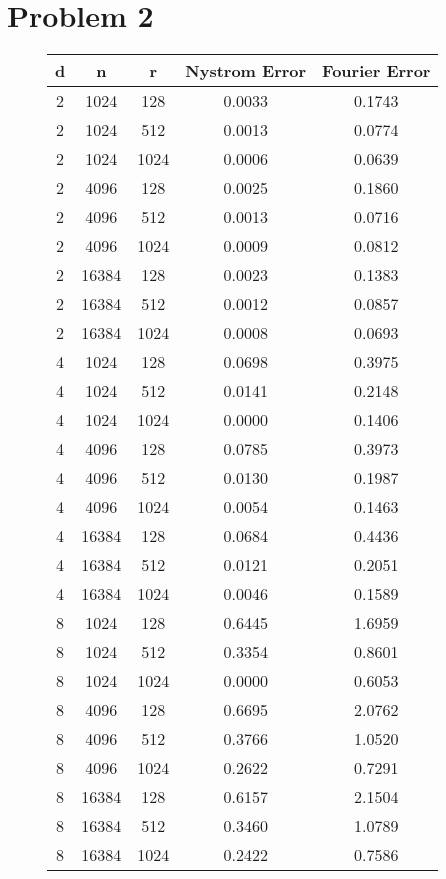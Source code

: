 \documentclass[12pt]{report}
\begin{document}
\section*{Problem 2}

\begin{figure}[H]
\centering
\begin{tabular}{|c|c|c|c|c|}
  \toprule
  d & n & r & Nystrom Error & Fourier Error \\
  \midrule
  2 & 1024 & 128 & 0.0033 & 0.1743 \\
  2 & 1024 & 512 & 0.0013 & 0.0774 \\
  2 & 1024 & 1024 & 0.0006 & 0.0639 \\
  2 & 4096 & 128 & 0.0025 & 0.1860 \\
  2 & 4096 & 512 & 0.0013 & 0.0716 \\
  2 & 4096 & 1024 & 0.0009 & 0.0812 \\
  2 & 16384 & 128 & 0.0023 & 0.1383 \\
  2 & 16384 & 512 & 0.0012 & 0.0857 \\
  2 & 16384 & 1024 & 0.0008 & 0.0693 \\
  4 & 1024 & 128 & 0.0698 & 0.3975 \\
  4 & 1024 & 512 & 0.0141 & 0.2148 \\
  4 & 1024 & 1024 & 0.0000 & 0.1406 \\
  4 & 4096 & 128 & 0.0785 & 0.3973 \\
  4 & 4096 & 512 & 0.0130 & 0.1987 \\
  4 & 4096 & 1024 & 0.0054 & 0.1463 \\
  4 & 16384 & 128 & 0.0684 & 0.4436 \\
  4 & 16384 & 512 & 0.0121 & 0.2051 \\
  4 & 16384 & 1024 & 0.0046 & 0.1589 \\
  8 & 1024 & 128 & 0.6445 & 1.6959 \\
  8 & 1024 & 512 & 0.3354 & 0.8601 \\
  8 & 1024 & 1024 & 0.0000 & 0.6053 \\
  8 & 4096 & 128 & 0.6695 & 2.0762 \\
  8 & 4096 & 512 & 0.3766 & 1.0520 \\
  8 & 4096 & 1024 & 0.2622 & 0.7291 \\
  8 & 16384 & 128 & 0.6157 & 2.1504 \\
  8 & 16384 & 512 & 0.3460 & 1.0789 \\
  8 & 16384 & 1024 & 0.2422 & 0.7586 \\

\end{tabular}
\end{figure}
\end{document}
